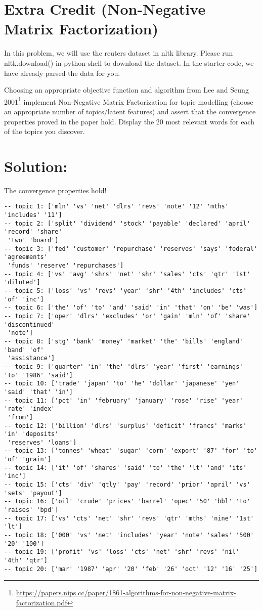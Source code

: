 \documentclass[189]{pset}
\begin{document}
  \clearpage


  \section{Extra Credit (Non-Negative Matrix Factorization)}
    In this problem, we will use the reuters dataset in nltk library.
    Please run nltk.download() in python shell to download the
    dataset. In the starter code, we have already parsed the data for
    you.

    Choosing an appropriate objective function and algorithm from Lee
    and Seung
    2001\footnote{\url{https://papers.nips.cc/paper/1861-algorithms-for-non-negative-matrix-factorization.pdf}}
    implement Non-Negative Matrix Factorization for topic modelling
    (choose an appropriate number of topics/latent features) and
    assert that the convergence properties proved in the paper hold.
    Display the 20 most relevant words for each of the topics you
    discover.

  \hrulefill

  \section*{Solution:}
  The convergence properties hold!
    \begin{verbatim}
-- topic 1: ['mln' 'vs' 'net' 'dlrs' 'revs' 'note' '12' 'mths' 'includes' '11']
-- topic 2: ['split' 'dividend' 'stock' 'payable' 'declared' 'april' 'record' 'share'
 'two' 'board']
-- topic 3: ['fed' 'customer' 'repurchase' 'reserves' 'says' 'federal' 'agreements'
 'funds' 'reserve' 'repurchases']
-- topic 4: ['vs' 'avg' 'shrs' 'net' 'shr' 'sales' 'cts' 'qtr' '1st' 'diluted']
-- topic 5: ['loss' 'vs' 'revs' 'year' 'shr' '4th' 'includes' 'cts' 'of' 'inc']
-- topic 6: ['the' 'of' 'to' 'and' 'said' 'in' 'that' 'on' 'be' 'was']
-- topic 7: ['oper' 'dlrs' 'excludes' 'or' 'gain' 'mln' 'of' 'share' 'discontinued'
 'note']
-- topic 8: ['stg' 'bank' 'money' 'market' 'the' 'bills' 'england' 'band' 'of'
 'assistance']
-- topic 9: ['quarter' 'in' 'the' 'dlrs' 'year' 'first' 'earnings' 'to' '1986' 'said']
-- topic 10: ['trade' 'japan' 'to' 'he' 'dollar' 'japanese' 'yen' 'said' 'that' 'in']
-- topic 11: ['pct' 'in' 'february' 'january' 'rose' 'rise' 'year' 'rate' 'index'
 'from']
-- topic 12: ['billion' 'dlrs' 'surplus' 'deficit' 'francs' 'marks' 'in' 'deposits'
 'reserves' 'loans']
-- topic 13: ['tonnes' 'wheat' 'sugar' 'corn' 'export' '87' 'for' 'to' 'of' 'grain']
-- topic 14: ['it' 'of' 'shares' 'said' 'to' 'the' 'lt' 'and' 'its' 'inc']
-- topic 15: ['cts' 'div' 'qtly' 'pay' 'record' 'prior' 'april' 'vs' 'sets' 'payout']
-- topic 16: ['oil' 'crude' 'prices' 'barrel' 'opec' '50' 'bbl' 'to' 'raises' 'bpd']
-- topic 17: ['vs' 'cts' 'net' 'shr' 'revs' 'qtr' 'mths' 'nine' '1st' 'lt']
-- topic 18: ['000' 'vs' 'net' 'includes' 'year' 'note' 'sales' '500' '20' '100']
-- topic 19: ['profit' 'vs' 'loss' 'cts' 'net' 'shr' 'revs' 'nil' '4th' 'qtr']
-- topic 20: ['mar' '1987' 'apr' '20' 'feb' '26' 'oct' '12' '16' '25']
\end{verbatim}
\end{document}
